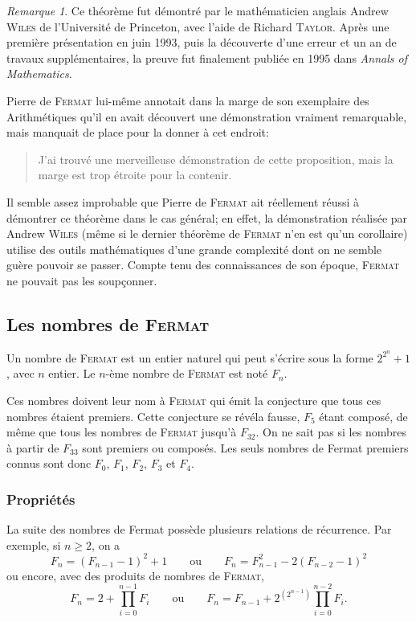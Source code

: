 \documentclass[a4paper,11pt]{article}
\theoremstyle{plain}
\theoremstyle{definition}
\theoremstyle{remark}
\newtheorem*{rmk}{Remarque}
\newcommand{\nom}[1]{\textsc{#1}\xspace}
\newcommand{\fermat}{\nom{Fermat}}
\begin{document}
\begin{rmk}
Ce théorème fut démontré par le mathématicien anglais Andrew \textsc{Wiles} de l'Université de Princeton, avec l'aide de Richard \textsc{Taylor}. Après une première présentation en juin 1993, puis la découverte d'une erreur et un an de travaux supplémentaires, la preuve fut finalement publiée en 1995 dans \emph{Annals of Mathematics}. 

Pierre de \fermat lui-même annotait dans la marge de son exemplaire des Arithmétiques qu’il en avait découvert une démonstration vraiment remarquable, mais manquait de place pour la donner à cet endroit:
\begin{quotation}
\flqq J'ai trouvé une merveilleuse démonstration de cette proposition, mais la marge est trop étroite pour la contenir.\frqq
\end{quotation}
Il semble assez improbable que Pierre de \fermat ait réellement réussi à démontrer ce théorème dans le cas général; en effet, la démonstration réalisée par Andrew \textsc{Wiles} (même si le dernier théorème de \fermat n'en est qu'un corollaire) utilise des outils mathématiques d'une grande complexité dont on ne semble guère pouvoir se passer. Compte tenu des connaissances de son époque, \fermat ne pouvait pas les soupçonner.
\end{rmk}







\subsection{Les nombres de \fermat}
Un nombre de \fermat est un entier naturel qui peut s'écrire sous la forme $2^{2^n}+1$, avec $n$ entier. Le $n$-ème nombre de \fermat est noté $F_n$.

Ces nombres doivent leur nom à \fermat qui émit la conjecture que tous ces nombres étaient premiers. Cette conjecture se révéla fausse, $F_5$ étant composé, de même que tous les nombres de \fermat jusqu'à $F_{32}$. On ne sait pas si les nombres à partir de $F_{33}$ sont premiers ou composés. Les seuls nombres de Fermat premiers connus sont donc $F_0$, $F_1$, $F_2$, $F_3$ et $F_4$.


\subsubsection{Propriétés}
La suite des nombres de Fermat possède plusieurs relations de récurrence. Par exemple, si $n\ge2$, on a
\[
F_n=(F_{n-1}-1)^2+1
\qquad\text{ou}\qquad
F_n=F_{n-1}^2-2(F_{n-2}-1)^2
\]
ou encore, avec des produits de nombres de \fermat,
\[
F_n=2+\prod_{i=0}^{n-1}F_i
\qquad\text{ou}\qquad
F_n=F_{n-1}+2^{(2^{n-1})}\prod_{i=0}^{n-2}F_i.
\]
\end{document}
